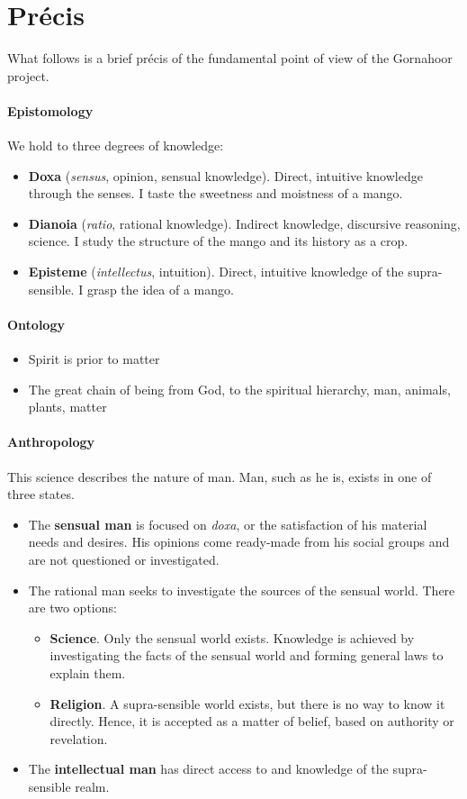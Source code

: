 \section{Précis}

What follows is a brief précis of the fundamental point of view of the Gornahoor project.

\paragraph{Epistomology}
We hold to three degrees of knowledge:

\begin{itemize}
\item \textbf{Doxa }(\emph{sensus}, opinion, sensual knowledge). Direct, intuitive knowledge through the senses. I taste the sweetness and moistness of a mango. 
\item \textbf{Dianoia }(\emph{ratio}, rational knowledge). Indirect knowledge, discursive reasoning, science. I study the structure of the mango and its history as a crop. 
\item \textbf{Episteme }(\emph{intellectus}, intuition). Direct, intuitive knowledge of the supra-sensible. I grasp the idea of a mango. 
\end{itemize}
\paragraph{Ontology}
\begin{itemize}
\item Spirit is prior to matter 
\item The great chain of being from God, to the spiritual hierarchy, man, animals, plants, matter 
\end{itemize}
\paragraph{Anthropology}
This science describes the nature of man. Man, such as he is, exists in one of three states.

\begin{itemize}
\item The \textbf{sensual man} is focused on \emph{doxa}, or the satisfaction of his material needs and desires. His opinions come ready-made from his social groups and are not questioned or investigated. 
\item The rational man seeks to investigate the sources of the sensual world. There are two options: 

\begin{itemize}
\item \textbf{Science}. Only the sensual world exists. Knowledge is achieved by investigating the facts of the sensual world and forming general laws to explain them. 
\item \textbf{Religion}. A supra-sensible world exists, but there is no way to know it directly. Hence, it is accepted as a matter of belief, based on authority or revelation. 
\end{itemize}
\item The \textbf{intellectual man} has direct access to and knowledge of the supra-sensible realm. 
\end{itemize}
